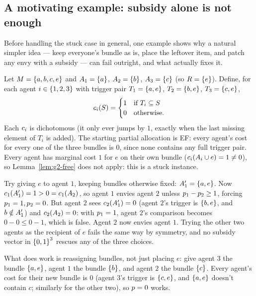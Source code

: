 \subsection{A motivating example: subsidy alone is not enough}
\label{sec:g2-example}

Before handling the stuck case in general, one example shows why a natural
simpler idea --- keep everyone's bundle as is, place the leftover item, and
patch any envy with a subsidy --- can fail outright, and what actually fixes
it.

\begin{example}
\label{ex:g2-motivating}
Let $M = \left\{a,b,c,e\right\}$ and $A_{1} = \left\{a\right\}$, $A_{2} = \left\{b\right\}$,
$A_{3} = \left\{c\right\}$ (so $R = \left\{e\right\}$). Define, for each agent $i \in
\left\{1,2,3\right\}$ with trigger pair $T_1 = \left\{a,e\right\}$, $T_2 = \left\{b,e\right\}$, $T_3 =
\left\{c,e\right\}$,
\[
  c_i(S) = \begin{cases} 1 & \text{if } T_i \subseteq S \\ 0 & \text{otherwise.} \end{cases}
\]
Each $c_i$ is dichotomous (it only ever jumps by $1$, exactly when the
last missing element of $T_i$ is added). The starting partial allocation is
EF: every agent's cost for every one of the three bundles is $0$, since none
contains any full trigger pair. Every agent has marginal cost $1$ for $e$ on
their own bundle ($c_i(A_{i} \cup e) = 1 \ne 0$), so Lemma~\ref{lem:g2-free}
does not apply: this is a stuck instance.

Try giving $e$ to agent $1$, keeping bundles otherwise fixed:
$A_{1}' = \left\{a,e\right\}$. Now $c_1(A_{1}') = 1 > 0 = c_1(A_{2})$,
so agent $1$ envies agent $2$ unless $p_1 - p_2 \ge 1$, forcing
$p_1 = 1, p_2 = 0$. But agent $2$ sees $c_2(A_{1}') = 0$
(agent $2$'s trigger is $\left\{b,e\right\}$, and $b \notin A_{1}'$) and
$c_2(A_{2}) = 0$: with $p_1 = 1$, agent $2$'s comparison becomes
$0 - 0 \le 0 - 1$, which is false. Agent $2$ now envies agent $1$. Trying the
other two agents as the recipient of $e$ fails the same way by symmetry, and
no subsidy vector in $\left\{0,1\right\}^3$ rescues any of the three choices.

What does work is reassigning bundles, not just placing $e$: give agent $3$
the bundle $\left\{a,e\right\}$, agent $1$ the bundle $\left\{b\right\}$, and agent $2$ the
bundle $\left\{c\right\}$. Every agent's cost for their new bundle is $0$ (agent $3$'s
trigger is $\left\{c,e\right\}$, and $\left\{a,e\right\}$ doesn't contain $c$; similarly for
the other two), so $p = 0$ works.
\end{example}

